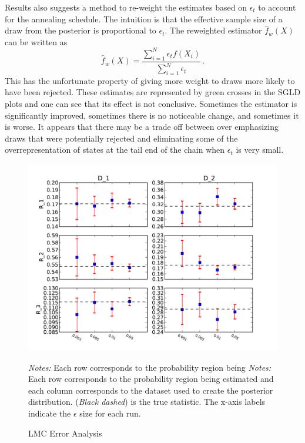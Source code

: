 \documentclass{article}
\begin{document}
\begin{section}{Results}
\cite{WelTeh2011a} also suggests a method to re-weight the estimates based on $\epsilon_t$ to account for the annealing schedule.  The intuition is that the effective sample size of a draw from the posterior is proportional to $\epsilon_t$.  The reweighted estimator  $\hat{f}_w(X)$ can be written as
$$ \hat{f}_w(X) = \frac{\sum_{i=1}^N \epsilon_t f(X_i)}{\sum_{i=1}^N \epsilon_t} \,.$$
This has the unfortunate property of giving more weight to draws more likely to have been rejected.  These estimates are represented by green crosses in the SGLD plots and one can see that its effect is not conclusive.  Sometimes the estimator is significantly improved, sometimes there is no noticeable change, and sometimes it is worse.  It appears that there may be a trade off between over emphasizing draws that were potentially rejected and eliminating some of the overrepresentation of states at the tail end of the chain when $\epsilon_t$ is very small.
\begin{figure}
\caption{LMC Error Analysis}
\label{lmc}
\begin{center}
\includegraphics[scale=0.7]{../figures/errors_n100.pdf}
\end{center}
{\scriptsize {\em Notes:} Each row corresponds to the probability region being {\em Notes:} Each row corresponds to the probability region being estimated and each column corresponds to the dataset used to create the posterior distribution. ({\em Black dashed}) is the true statistic.  The x-axis labels indicate the $\epsilon$ size for each run. }
\end{figure}


\end{section}
\end{document}
